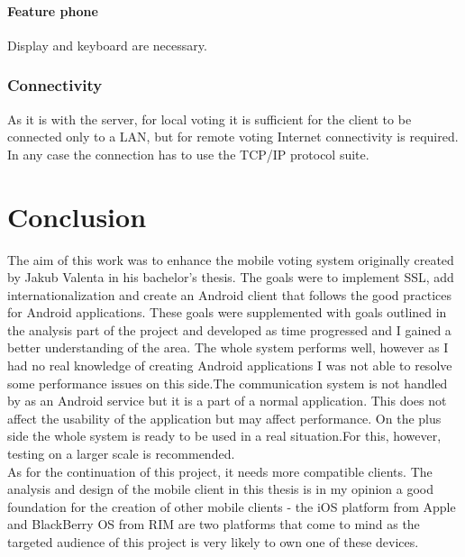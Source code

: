 \documentclass[11pt,twoside,a4paper]{book}
\begin{document}
\subsubsection{Feature phone}
Display and keyboard are necessary.
\subsection{Connectivity}
As it is with the server, for local voting it is sufficient for the client to be connected only to a LAN, but for remote voting Internet connectivity is required. In any case the connection has to use the TCP/IP protocol suite. 





\chapter{Conclusion}
The aim of this work was to enhance the mobile voting system originally  created by Jakub Valenta in his bachelor's thesis. The goals were to implement SSL, add internationalization and create an Android client that follows the good practices for Android applications. These goals were supplemented with goals outlined in the analysis part of the project and developed as time progressed and I gained a better understanding of the area. The whole system performs well, however as I had no real knowledge of creating Android applications I was not able to resolve some performance issues on this side.The communication system is not handled by as an Android service but it is a part of a normal application. This does not affect the usability of the application but may affect performance. On the plus side the whole system is ready to be used in a real situation.For this, however, testing on a larger scale is recommended.\\



As for the continuation of this project, it needs more compatible clients. The analysis and design of the mobile client in this thesis is in my opinion a good foundation for the creation of other mobile clients - the iOS platform from Apple and BlackBerry OS from RIM are two platforms that come to mind as the targeted audience of this project is very likely to own one of these devices.  




{
\def\CS{$\cal C\kern-0.1667em\lower.5ex\hbox{$\cal S$}\kern-0.075em $}

}
\end{document}
